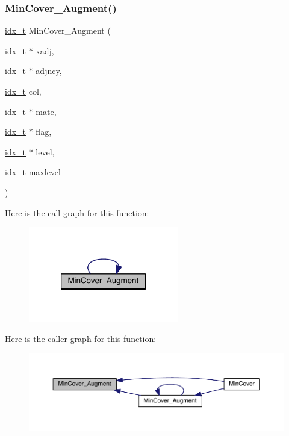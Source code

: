 \subsubsection{\texorpdfstring{Min\+Cover\+\_\+\+Augment()}{MinCover\_Augment()}}
{\footnotesize\ttfamily \hyperlink{a00876_aaa5262be3e700770163401acb0150f52}{idx\+\_\+t} Min\+Cover\+\_\+\+Augment (\begin{DoxyParamCaption}\item[{\hyperlink{a00876_aaa5262be3e700770163401acb0150f52}{idx\+\_\+t} $\ast$}]{xadj,  }\item[{\hyperlink{a00876_aaa5262be3e700770163401acb0150f52}{idx\+\_\+t} $\ast$}]{adjncy,  }\item[{\hyperlink{a00876_aaa5262be3e700770163401acb0150f52}{idx\+\_\+t}}]{col,  }\item[{\hyperlink{a00876_aaa5262be3e700770163401acb0150f52}{idx\+\_\+t} $\ast$}]{mate,  }\item[{\hyperlink{a00876_aaa5262be3e700770163401acb0150f52}{idx\+\_\+t} $\ast$}]{flag,  }\item[{\hyperlink{a00876_aaa5262be3e700770163401acb0150f52}{idx\+\_\+t} $\ast$}]{level,  }\item[{\hyperlink{a00876_aaa5262be3e700770163401acb0150f52}{idx\+\_\+t}}]{maxlevel }\end{DoxyParamCaption})}

Here is the call graph for this function\+:\nopagebreak
\begin{figure}[H]
\begin{center}
\leavevmode
\includegraphics[width=186pt]{a00245_ad4fd2d52a6465e871ff38851cf443744_cgraph}
\end{center}
\end{figure}
Here is the caller graph for this function\+:\nopagebreak
\begin{figure}[H]
\begin{center}
\leavevmode
\includegraphics[width=350pt]{a00245_ad4fd2d52a6465e871ff38851cf443744_icgraph}
\end{center}
\end{figure}
\mbox{\label{a00245_a4c92a2e434179f264498adf840127095}} 
